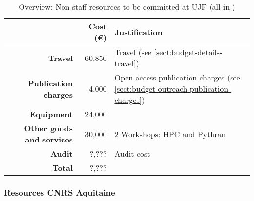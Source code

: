 \bigskip
\begin{table}[H]
\begin{tabular}{|r|r|p{9cm}|}
\hline
\textbf{} & \textbf{Cost (\euro)} & \textbf{Justification} \\\hline
\textbf{Travel} & 60,850 & Travel (see \ref{sect:budget-details-travel})\\\hline
\textbf{Publication charges} & 4,000 & Open access publication charges (see \ref{sect:budget-outreach-publication-charges})\\\hline
\textbf{Equipment} & 24,000 &  \\\hline    %

\textbf{Other goods and services} & 30,000 & 2 Workshops: HPC and Pythran \\\hline   %
\textbf{Audit} & ?,??? & Audit cost \\\hline
\textbf{Total} & ?,???\\\cline{1-2}
\end{tabular}
\caption{Overview: Non-staff resources to be committed at UJF (all in \texteuro)}\vspace*{-1em}
\end{table}




\subsubsection{Resources CNRS Aquitaine}


